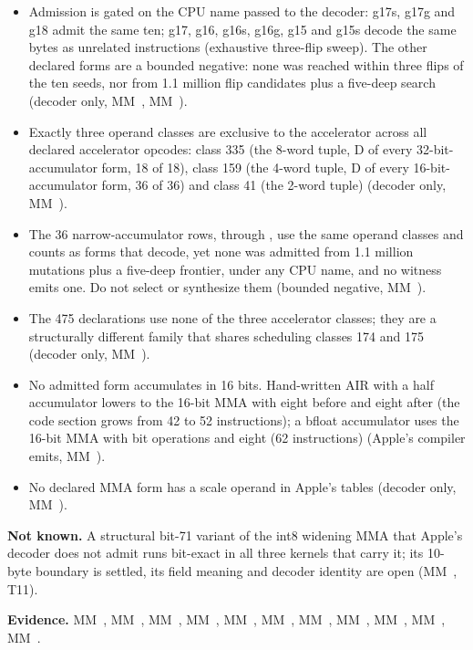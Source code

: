 \begin{itemize}
\item Admission is gated on the CPU name passed to the decoder: g17s, g17g and g18 admit the same ten; g17, g16, g16s,
  g16g, g15 and g15s decode the same bytes as unrelated instructions (exhaustive three-flip sweep). The other declared
  forms are a bounded negative: none was reached within three flips of the ten seeds, nor from 1.1 million flip
  candidates plus a five-deep search (decoder only, MM~, MM~).
\item Exactly three operand classes are exclusive to the accelerator across all declared accelerator opcodes: class 335 (the
  8-word tuple, D of every 32-bit-accumulator form, 18 of 18), class 159 (the 4-word tuple, D of every
  16-bit-accumulator form, 36 of 36) and class 41 (the 2-word tuple) (decoder only, MM~).
\item The 36 narrow-accumulator rows,  through , use the same operand classes and counts as forms that decode,
  yet none was admitted from 1.1 million mutations plus a five-deep frontier, under any CPU name, and no witness emits
  one. Do not select or synthesize them (bounded negative, MM~).
\item The 475  declarations use none of the three accelerator classes; they are a structurally different family
  that shares scheduling classes 174 and 175 (decoder only, MM~).
\item No admitted form accumulates in 16 bits. Hand-written AIR with a half accumulator lowers to the 16-bit MMA with
  eight  before and eight  after (the code section grows
  from 42 to 52 instructions); a bfloat accumulator uses the 16-bit MMA with bit operations and eight  (62 instructions) (Apple's compiler emits, MM~).
\item No declared MMA form has a scale operand in Apple's tables (decoder only, MM~).
\end{itemize}

\textbf{Not known.} A structural bit-71 variant of the int8 widening MMA that Apple's decoder  does not
admit runs bit-exact in all three kernels that carry it; its 10-byte boundary is settled, its field meaning and decoder
identity are open (MM~, T11).

\textbf{Evidence.} MM~, MM~, MM~, MM~, MM~, MM~, MM~, MM~, MM~, MM~,
MM~.

